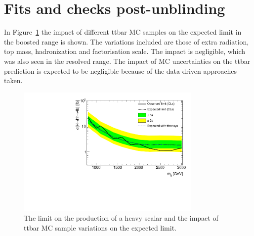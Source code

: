 \section{Fits and checks post-unblinding}
\label{app:unblindedfits}

In Figure~\ref{fig:unblindedfits:ttsyslimit} the impact of different ttbar MC samples on the expected limit in the boosted range is shown. The variations included are those of extra radiation, top mass, hadronization and factorisation scale. The impact is negligible, which was also seen in the resolved range. The impact of MC uncertainties on the ttbar prediction is expected to be negligible because of the data-driven approaches taken. 

\begin{figure}[htbp!]
\begin{center}
\includegraphics[width=0.8\textwidth,angle=-90]{figures/boosted/app-unblindedfits/ttsyslimit.pdf}
\caption{The limit on the production of a heavy scalar and the impact of ttbar MC sample variations on the expected limit.}
\label{fig:unblindedfits:ttsyslimit}
\end{center}
\end{figure}


